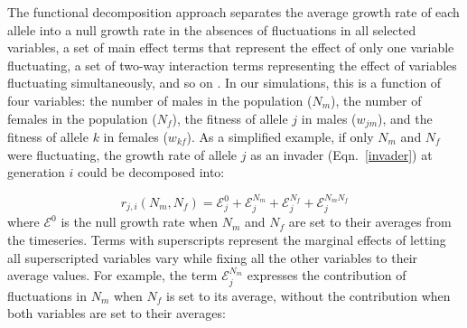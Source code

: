 \begin{refsection}


The functional decomposition approach separates the average growth rate of each allele into a null growth rate in the absences of fluctuations in all selected variables, a set of main effect terms that represent the effect of only one variable fluctuating, a set of two-way interaction terms representing the effect of variables fluctuating simultaneously, and so on \citep{ellner_expanded_2019}. In our simulations, this is a function of four variables: the number of males in the population ($N_{m}$), the number of females in the population ($N_{f}$), the fitness of allele $j$ in males ($w_{jm}$), and the fitness of allele $k$ in females ($w_{kf}$). As a simplified example, if only $N_{m}$ and $N_{f}$ were fluctuating, the growth rate of allele $j$ as an invader (Eqn.~\ref{invader}) at generation $i$ could be decomposed into:

\begin{equation}
   r_{j,i}(N_{m},N_{f}) = \mathcal{E}_{j}^{0} + \mathcal{E}_{j}^{N_{m}}+ \mathcal{E}_{j}^{N_{f}}+ \mathcal{E}_{j}^{N_{m}N_{f}}
   \label{functional_decomp}
\end{equation}
where $\mathcal{E}^0$ is the null growth rate when $N_{m}$ and $N_{f}$ are set to their averages from the timeseries. Terms with superscripts represent the marginal effects of letting all superscripted variables vary while fixing all the other variables to their average values. For example, the term $\mathcal{E}_{j}^{N_{m}}$ expresses the contribution of fluctuations in $N_{m}$ when $N_{f}$ is set to its average, without the contribution when both variables are set to their averages:


\end{refsection}
